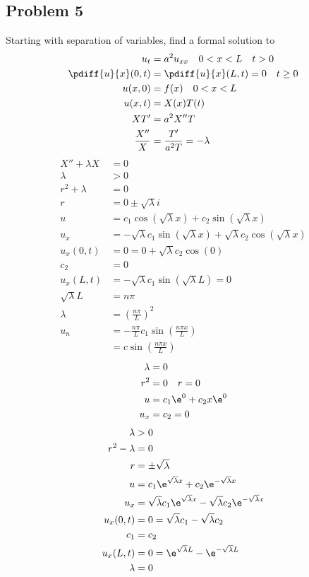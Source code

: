 \documentclass{math}
\begin{document}
\subsection*{Problem 5}
Starting with separation of variables, find a formal solution to
\begin{align*}
  u_t &= a^2u_{xx} \quad 0<x<L \quad t>0 \\
  \pdiff{u}{x}(0,t) &= \pdiff{u}{x}(L,t) = 0 \quad t\ge0 \\
  u(x,0) &= f(x) \quad 0<x<L \\
  u(x,t) &= X(x)T(t) \\
  XT' &= a^2X''T \\
  \frac{X''}{X} &= \frac{T'}{a^2T} = -\lambda \\
\end{align*}
\begin{align*}
  X''+\lambda X &= 0 \\
  \lambda &> 0 \\
  r^2+\lambda &= 0 \\
  r &= 0\pm\sqrt{\lambda}i \\
  u &= c_1\cos(\sqrt{\lambda}x)+c_2\sin(\sqrt{\lambda}x) \\
  u_x &= -\sqrt{\lambda}c_1\sin(\sqrt{\lambda}x)+
    \sqrt{\lambda}c_2\cos(\sqrt{\lambda}x) \\
  u_x(0,t) &= 0 = 0+\sqrt{\lambda}c_2\cos(0) \\
  c_2 &= 0 \\
  u_x(L,t) &= -\sqrt{\lambda}c_1\sin(\sqrt{\lambda}L) = 0 \\
  \sqrt{\lambda}L &= n\pi \\
  \lambda &= \left(\frac{n\pi}{L}\right)^2 \\
  u_n &= -\frac{n\pi}{L}c_1\sin(\frac{n\pi x}{L}) \\
  &= c\sin(\frac{n\pi x}{L})
\end{align*}
\begin{align*}
  \lambda &= 0 \\
  r^2 &= 0 \quad r = 0 \\
  u &= c_1\e^0+c_2x\e^0 \\
  u_x &= c_2 = 0
\end{align*}
\begin{align*}
  \lambda &> 0 \\
  r^2-\lambda &= 0 \\
  r &= \pm\sqrt{\lambda} \\
  u &= c_1\e^{\sqrt{\lambda}x}+c_2\e^{-\sqrt{\lambda}x} \\
  u_x &= \sqrt{\lambda}c_1\e^{\sqrt{\lambda}x}-
    \sqrt{\lambda}c_2\e^{-\sqrt{\lambda}x} \\
  u_x(0,t) &= 0 = \sqrt{\lambda}c_1-\sqrt{\lambda}c_2 \\
  c_1 &= c_2 \\
  u_x(L,t) &= 0 = \e^{\sqrt{\lambda}L}-\e^{-\sqrt{\lambda}L} \\
  \lambda &= 0
\end{align*}
\end{document}
